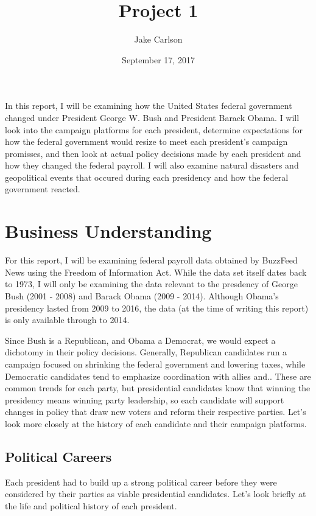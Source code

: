 \documentclass{article}
\begin{document}
\title{Project 1}
\author{Jake Carlson}
\date{September 17, 2017}
\maketitle

\abstract
In this report, I will be examining how the United States federal government changed under President George W. Bush and President Barack Obama. I will look into the campaign platforms for each president, determine expectations for how the federal government would resize to meet each president's campaign promisses, and then look at actual policy decisions made by each president and how they changed the federal payroll. I will also examine natural disasters and geopolitical events that occured during each presidency and how the federal government reacted.
\newpage

\tableofcontents
\newpage

\section{Business Understanding}
For this report, I will be examining federal payroll data obtained by BuzzFeed News using the Freedom of Information Act. While the data set itself dates back to 1973, I will only be examining the data relevant to the presdency of George Bush (2001 - 2008) and Barack Obama (2009 - 2014). Although Obama's presidency lasted from 2009 to 2016, the data (at the time of writing this report) is only available through to 2014.
\par
Since Bush is a Republican, and Obama a Democrat, we would expect a dichotomy in their policy decisions. Generally, Republican candidates run a campaign focused on shrinking the federal government and lowering taxes, while Democratic candidates tend to emphasize coordination with allies and.. These are common trends for each party, but presidential candidates know that winning the presidency means winning party leadership, so each candidate will support changes in policy that draw new voters and reform their respective parties. Let's look more closely at the history of each candidate and their campaign platforms.

    \subsection{Political Careers}
    Each president had to build up a strong political career before they were considered by their parties as viable presidential candidates. Let's look briefly at the life and political history of each president.
\end{document}
